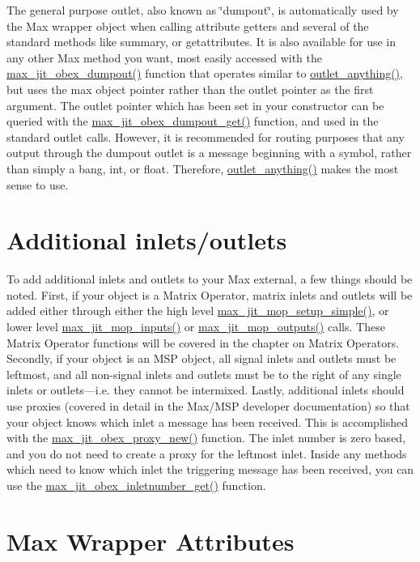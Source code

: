 The general purpose outlet, also known as \char`\"{}dumpout\char`\"{}, is automatically used by the Max wrapper object when calling attribute getters and several of the standard methods like summary, or getattributes. It is also available for use in any other Max method you want, most easily accessed with the \hyperlink{group__maxwrapmod_ga161cd54f4612d26057e4140b56e14729}{max\_\-jit\_\-obex\_\-dumpout()} function that operates similar to \hyperlink{group__inout_ga12798ee897e01dac21ee547c4091d8a8}{outlet\_\-anything()}, but uses the max object pointer rather than the outlet pointer as the first argument. The outlet pointer which has been set in your constructor can be queried with the \hyperlink{group__maxwrapmod_gae0f179c644d50a572a7c159db83490a5}{max\_\-jit\_\-obex\_\-dumpout\_\-get()} function, and used in the standard outlet calls. However, it is recommended for routing purposes that any output through the dumpout outlet is a message beginning with a symbol, rather than simply a bang, int, or float. Therefore, \hyperlink{group__inout_ga12798ee897e01dac21ee547c4091d8a8}{outlet\_\-anything()} makes the most sense to use.\hypertarget{chapter_jit_maxwrappers_chapter_jit_maxwrappers_inout}{}\section{Additional inlets/outlets}\label{chapter_jit_maxwrappers_chapter_jit_maxwrappers_inout}
To add additional inlets and outlets to your Max external, a few things should be noted. First, if your object is a Matrix Operator, matrix inlets and outlets will be added either through either the high level \hyperlink{group__maxmopmod_gac3eaca207281516b72e81f0dc5f4bf94}{max\_\-jit\_\-mop\_\-setup\_\-simple()}, or lower level \hyperlink{group__maxmopmod_gaec99be7b60c1cec6a8391097d5008bc6}{max\_\-jit\_\-mop\_\-inputs()} or \hyperlink{group__maxmopmod_ga07f044bc4c7fe4380f31e150844948df}{max\_\-jit\_\-mop\_\-outputs()} calls. These Matrix Operator functions will be covered in the chapter on Matrix Operators. Secondly, if your object is an MSP object, all signal inlets and outlets must be leftmost, and all non-\/signal inlets and outlets must be to the right of any single inlets or outlets—i.e. they cannot be intermixed. Lastly, additional inlets should use proxies (covered in detail in the Max/MSP developer documentation) so that your object knows which inlet a message has been received. This is accomplished with the \hyperlink{group__maxwrapmod_ga010c3e4a11d73d6553b7513719a19b7f}{max\_\-jit\_\-obex\_\-proxy\_\-new()} function. The inlet number is zero based, and you do not need to create a proxy for the leftmost inlet. Inside any methods which need to know which inlet the triggering message has been received, you can use the \hyperlink{group__maxwrapmod_ga2c0d72889d3a89cbabe1001d55c86c3e}{max\_\-jit\_\-obex\_\-inletnumber\_\-get()} function.\hypertarget{chapter_jit_maxwrappers_chapter_jit_maxwrappers_attrs}{}\section{Max Wrapper Attributes}\label{chapter_jit_maxwrappers_chapter_jit_maxwrappers_attrs}
